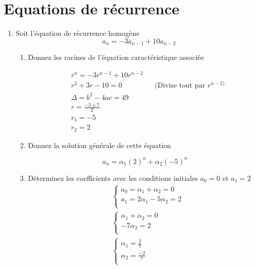 \documentclass[A4paper,11pt]{article}
\begin{document}
\section{Equations de récurrence}
\begin{enumerate}
    \item Soit l'équation de récurrence homogène 
    \[ a_n = -3a_{n-1} + 10a_{n-2}\]
    \begin{enumerate}
        \item Donnez les racines de l'équation caractéristique associée
        
        \begin{align*}
            &r^n = -3 r^{n-1} +10r^{n-2}\\
            &r^2 +3r -10 = 0 && \text{(Divise tout par } r^{n-2)}\\
            &\Delta = b^2 - 4ac = 49
            \\
            &r = \frac{-3 \pm 7}{2}\\
            &r_1 = -5\\
            &r_2 = 2
        \end{align*}
        
        \item Donnez la solution générale de cette équation
        
        \[
        a_n = \alpha_1 (2)^n + \alpha_2 (-5)^n
        \]
        
        \item Déterminez les coefficients avec les conditions initiales $a_0 = 0$ et $a_1 = 2$
        \begin{align*}
        &\begin{cases}
            a_0 = \alpha_1 + \alpha_2 = 0\\
            a_1 = 2\alpha_1 -5 \alpha_2= 2\\
        \end{cases}\\
        &\begin{cases}
            \alpha_1 + \alpha_2 = 0\\
             -7 \alpha_2= 2\\
        \end{cases}\\
        &\begin{cases}
            \alpha_1 = \frac{2}{7}\\
              \alpha_2= \frac{-2}{7}\\
        \end{cases}
        \end{align*}
        

\end{enumerate}
\end{enumerate}
\end{document}
